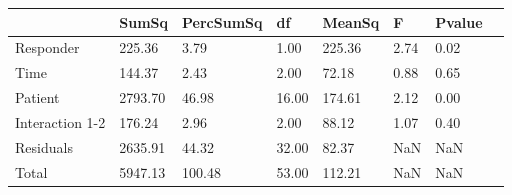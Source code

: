 \begin{tabular}{llllllll}
 & SumSq & PercSumSq & df & MeanSq & F & Pvalue \\ 
 \hline 
Responder & 225.36 & 3.79 & 1.00 & 225.36 & 2.74 & 0.02 \\ 
Time & 144.37 & 2.43 & 2.00 & 72.18 & 0.88 & 0.65 \\ 
Patient & 2793.70 & 46.98 & 16.00 & 174.61 & 2.12 & 0.00 \\ 
Interaction 1-2 & 176.24 & 2.96 & 2.00 & 88.12 & 1.07 & 0.40 \\ 
Residuals & 2635.91 & 44.32 & 32.00 & 82.37 & NaN & NaN \\ 
Total & 5947.13 & 100.48 & 53.00 & 112.21 & NaN & NaN \\ 
\end{tabular} 
